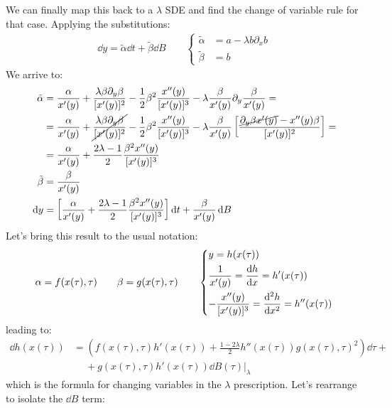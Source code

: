 \documentclass[../template.tex]{subfiles}
\begin{document}
\begin{exo}
We can finally map this back to a $\lambda$ SDE and find the change of variable rule for that case. Applying the substitutions:
\begin{align*}
    \dd{y} = \tilde{\alpha} \dd{t} + \tilde{\beta} \dd{B} \qquad \begin{cases}
        \tilde{\alpha} &= a-\lambda b \partial_x b\\
    \tilde{\beta} &= b
    \end{cases}
\end{align*}
We arrive to:
\begin{align*}
    \tilde{\alpha} &= \frac{\alpha}{x'(y)} + \frac{\lambda \beta \partial_y \beta}{[x'(y)]^2} - \frac{1}{2} \beta^2 \frac{x''(y)}{[x'(y)]^3} - \lambda \frac{\beta}{x'(y)} \partial_y \frac{\beta}{x'(y)}  =\\
    &= \frac{\alpha}{x'(y)} + \cancel{\frac{\lambda \beta \partial_y \beta}{[x'(y)]^2}} - \frac{1}{2} \beta^2 \frac{x''(y)}{[x'(y)]^3} - \lambda \frac{\beta}{x'(y)}\left[\frac{\cancel{\partial_y \beta x'(y)} - x''(y) \beta}{[x'(y)]^2} \right] =\\
    &= \frac{\alpha}{x'(y)} +\frac{2\lambda - 1}{2} \frac{\beta^2 x''(y)}{[x'(y)]^3}\\
    \tilde{\beta} &= \frac{\beta}{x'(y)}\\
    \dd{y} &= \left[\frac{\alpha}{x'(y)} +\frac{2\lambda - 1}{2} \frac{\beta^2 x''(y)}{[x'(y)]^3}\right] \dd{t} + \frac{\beta}{x'(y)} \dd{B} 
\end{align*}
Let's bring this result to the usual notation:
\begin{align*}
    \alpha = f(x(\tau), \tau) \qquad \beta = g(x(\tau),\tau) \qquad \begin{dcases}
        y = h(x(\tau))\\
        \frac{1}{x'(y)} = \dv{h}{x} = h'(x(\tau))\\
        -\frac{x''(y)}{[x'(y)]^3} = \dv[2]{h}{x} = h''(x(\tau)) 
    \end{dcases}
\end{align*}
leading to:
\begin{align*}
    \dd{h(x(\tau))} &= \left(f(x(\tau),\tau) h'(x(\tau)) + \frac{1-2 \lambda}{2} h''(x(\tau)) g(x(\tau), \tau)^2\right) \dd{\tau} +\\
    &\quad \> + g(x(\tau), \tau) h'(x(\tau)) \dd{B(\tau)} \Big|_\lambda
\end{align*}
which is the formula for changing variables in the $\lambda$ prescription. Let's rearrange to isolate the $\dd{B}$ term:
\begin{align*}

\end{align*}
\end{exo}
\end{document}

